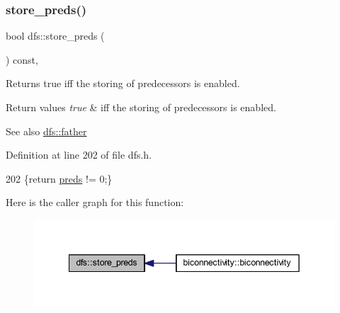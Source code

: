 \subsubsection{\texorpdfstring{store\+\_\+preds()}{store\_preds()}\hspace{0.1cm}{\footnotesize\ttfamily [2/2]}}
{\footnotesize\ttfamily bool dfs\+::store\+\_\+preds (\begin{DoxyParamCaption}{ }\end{DoxyParamCaption}) const\hspace{0.3cm}{\ttfamily [inline]}, {\ttfamily [inherited]}}



Returns true iff the storing of predecessors is enabled. 


\begin{DoxyRetVals}{Return values}
{\em true} & iff the storing of predecessors is enabled. \\
\hline
\end{DoxyRetVals}
\begin{DoxySeeAlso}{See also}
\mbox{\hyperlink{classdfs_a3012717ce541b3e56943e2c2c50efdf6}{dfs\+::father}} 
\end{DoxySeeAlso}


Definition at line 202 of file dfs.\+h.


\begin{DoxyCode}
202 \{\textcolor{keywordflow}{return} \mbox{\hyperlink{classdfs_a3fdeb5a211a1bc1753b2a637258c5355}{preds}} != 0;\}
\end{DoxyCode}
Here is the caller graph for this function\+:
\nopagebreak
\begin{figure}[H]
\begin{center}
\leavevmode
\includegraphics[width=342pt]{classdfs_ad0233128f2958d630102096aa6f3b9ef_icgraph}
\end{center}
\end{figure}
\mbox{\label{classdfs_afe193938a05b114870c19163731273c8}} 

